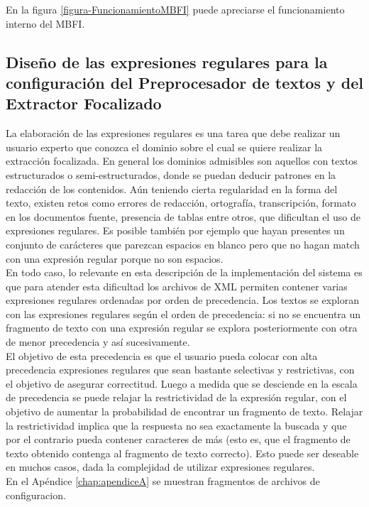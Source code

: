 En la figura \ref{figura-FuncionamientoMBFI} puede apreciarse el funcionamiento interno del MBFI. \\

\subsection{Diseño de las expresiones regulares para la configuración del Preprocesador de textos y del Extractor Focalizado}\label{sect:implementacion-regexp}

La elaboración de las expresiones regulares es una tarea que debe realizar un usuario experto que conozca el dominio sobre el cual se quiere realizar la extracción focalizada. En general los dominios admisibles son aquellos con textos estructurados o semi-estructurados, donde se puedan deducir patrones en la redacción de los contenidos. Aún teniendo cierta regularidad en la forma del texto, existen retos como errores de redacción, ortografía, transcripción, formato en los documentos fuente, presencia de tablas entre otros, que dificultan el uso de expresiones regulares. Es posible también por ejemplo que hayan presentes un conjunto de carácteres que parezcan espacios en blanco pero que no hagan match con una expresión regular porque no son espacios. \\

En todo caso, lo relevante en esta descripción de la implementación del sistema es que para atender esta dificultad los archivos de XML permiten contener varias expresiones regulares ordenadas por orden de precedencia. Los textos se exploran con las expresiones regulares según el orden de precedencia: si no se encuentra un fragmento de texto con una expresión regular se explora posteriormente con otra de menor precedencia y así sucesivamente. \\

El objetivo de esta precedencia es que el usuario pueda colocar con alta precedencia expresiones regulares que sean bastante selectivas y restrictivas, con el objetivo de asegurar correctitud. Luego a medida que se desciende en la escala de precedencia se puede relajar la restrictividad de la expresión regular, con el objetivo de aumentar la probabilidad de encontrar un fragmento de texto. Relajar la restrictividad implica que la respuesta no sea exactamente la buscada y que por el contrario pueda contener caracteres de más (esto es, que el fragmento de texto obtenido contenga al fragmento de texto correcto). Esto puede ser deseable en muchos casos, dada la complejidad de utilizar expresiones regulares.  \\

En el Apéndice \ref{chap:apendiceA} se muestran fragmentos de archivos de configuracion. \\
